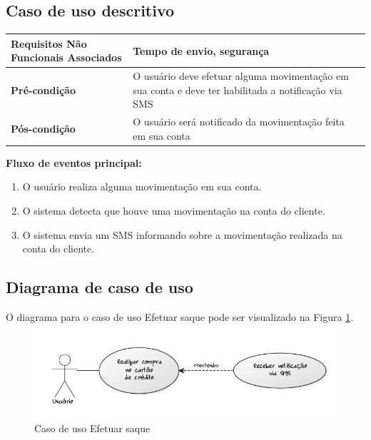 \subsection{Caso de uso descritivo}

\begin{table}[h]
  \centering
  \begin{tabular}{|p{4cm} | p{10cm} |}
      \hline
      \small{\textbf{Requisitos Não Funcionais Associados}}	& Tempo de envio, segurança	\\ \hline
      \small{\textbf{Pré-condição}}	&	O usuário deve efetuar alguma movimentação em sua conta e deve ter habilitada a notificação via SMS	\\ \hline
      \small{\textbf{Pós-condição}}	&	O usuário será notificado da movimentação feita em sua conta	\\ \hline
    \end{tabular}
\end{table}

\textbf{Fluxo de eventos principal:}

\begin{enumerate}
  \item O usuário realiza alguma movimentação em sua conta.
  \item O sistema detecta que houve uma movimentação na conta do cliente.
  \item O sistema envia um SMS informando sobre a movimentação realizada na conta do cliente.
\end{enumerate}

\subsection{Diagrama de caso de uso}

O diagrama para o caso de uso Efetuar saque pode ser visualizado na Figura \ref{cdu:efetuarSaque}.

\begin{figure}[!htb]
     \centering
     \includegraphics[scale=0.6]{diagramas/caso-de-uso/imagens/receberNotificacaoSms.png}
     \caption{Caso de uso Efetuar saque}
     \label{cdu:efetuarSaque}
\end{figure}

